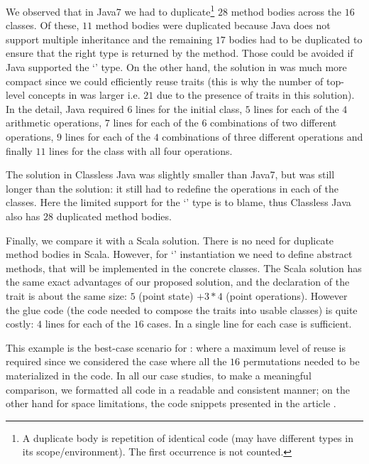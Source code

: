 \noindent We observed that in Java7 we had to duplicate\footnote{A duplicate body is repetition of identical code (may have different types in its scope/environment). The first occurrence is not counted. } $28$ method bodies across the $16$ classes.
Of these, $11$ method bodies were duplicated because Java does not support multiple inheritance
 and the remaining $17$ bodies had to be duplicated to ensure that the right type
 is returned by the method. Those could be avoided if Java supported
 the `\Q@This@' type.
 On the other hand, the solution in \name was much more compact since we could efficiently
reuse traits (this is why the number of top-level concepts in \name was larger i.e. $21$ due to the
 presence of traits in this solution).
In the detail, Java required $6$ lines for the initial \Q@Point@ class,
$5$ lines for each of the $4$ arithmetic operations, $7$ lines for each of the $6$ combinations
of two different operations, $9$ lines for each of the $4$ combinations of three different 
operations and finally $11$ lines for the class with all four operations.


 The solution in Classless Java was slightly smaller than Java7,
 but was still longer than the \name solution: it still had to redefine the
  operations in each of the classes. Here the limited
 support for the `\Q@This@' type is to blame, thus Classless Java also has $28$ duplicated method bodies.

Finally, we compare it with a Scala solution.
There is no need for duplicate method bodies in Scala.
However, for `\Q@This@' instantiation we need to define abstract methods, that will be implemented in the concrete classes.
The Scala solution has the same exact advantages
of our proposed solution, and the declaration
of the trait is about the same size: 
$5$ (point state) $+3*4$ (point operations).
However the glue code (the code needed to compose the traits into usable classes) is quite costly:
$4$ lines for each of the $16$ cases.
In \name a single line for each case is sufficient.

This example is the best-case scenario for \name: where a maximum level of reuse
 is required since we considered the case where all the $16$ permutations needed to be materialized in the code.
In all our case studies, to make a meaningful comparison, we formatted all code in a readable and consistent manner;
on the other hand for space limitations, the code snippets presented in the article
.



